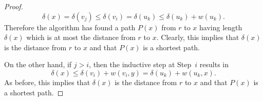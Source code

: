\documentclass[10pt,]{book}
\theoremstyle{plain}
\theoremstyle{definition}
\theoremstyle{definition}
\theoremstyle{definition}
\theoremstyle{definition}
\numberwithin{equation}{section}
\begin{document}
\begin{proof}
\begin{equation*}
\delta(x)= \delta(v_j)\le \delta(v_i)= \delta(u_k)\le
\delta(u_k)+w(u_k).
\end{equation*}
Therefore the algorithm has found a path \(P(x)\) from \(r\) to \(x\) having length \(\delta(x)\) which is at most the distance from \(r\) to \(x\). Clearly, this implies that \(\delta(x)\) is the distance from \(r\) to \(x\) and that \(P(x)\) is a shortest path.%
\par
\hypertarget{p-232}{}%
On the other hand, if \(j>i\), then the inductive step at Step~\(i\) results in%
\begin{equation*}
\delta(x)\le \delta(v_i)+w(v_i,y)=\delta(u_k)+w(u_k,x).
\end{equation*}
As before, this implies that \(\delta(x)\) is the distance from \(r\) to \(x\) and that \(P(x)\) is a shortest path.%
\end{proof}
\typeout{************************************************}
\typeout{************************************************}
\end{document}
